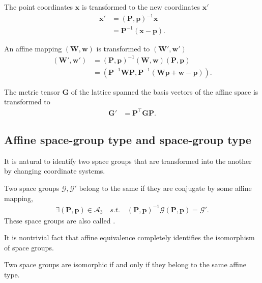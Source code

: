 The point coordinates $\bm{x}$ is transformed to the new coordinates $\bm{x}'$
\begin{align}
  \bm{x}'
  &= (\bm{P}, \bm{p})^{-1} \bm{x} \nonumber \\
  &= \bm{P}^{-1} ( \bm{x} - \bm{p} ).
\end{align}

An affine mapping $(\bm{W}, \bm{w})$ is transformed to $(\bm{W}', \bm{w}')$
\begin{align}
  (\bm{W}', \bm{w}')
  &= (\bm{P}, \bm{p})^{-1} (\bm{W}, \bm{w}) (\bm{P}, \bm{p}) \nonumber \\
  &= \left( \bm{P}^{-1} \bm{W} \bm{P}, \bm{P}^{-1}(\bm{Wp} + \bm{w} - \bm{p}) \right).
\end{align}

The metric tensor $\bm{G}$ of the lattice spanned the basis vectors of the affine space is transformed to
\begin{align}
  \bm{G}' &= \bm{P}^{\top} \bm{GP}.
\end{align}

\subsection{\label{sec:space-group-type}Affine space-group type and space-group type}

It is natural to identify two space groups that are transformed into the another by changing coordinate systems.

\begin{screen}
  \begin{defn}
    Two space groups $\mathcal{G}, \mathcal{G}'$ belong to the same  if they are conjugate by some affine mapping,
    \begin{align}
      \exists (\bm{P}, \bm{p}) \in \mathcal{A}_{3} \quad s.t. \quad (\bm{P}, \bm{p})^{-1} \mathcal{G} (\bm{P}, \bm{p}) = \mathcal{G}'.
    \end{align}
    These space groups are also called .
  \end{defn}
\end{screen}

It is nontrivial fact that affine equivalence completely identifies the isomorphism of space groups.

\begin{screen}
  \begin{theorem}[Bieberbach]
    Two space groups are isomorphic if and only if they belong to the same affine type.
  \end{theorem}
\end{screen}

